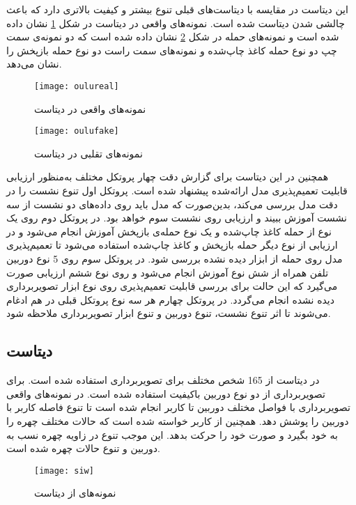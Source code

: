 این دیتاست در مقایسه با دیتاست‌های قبلی تنوع بیشتر و کیفیت بالاتری دارد که باعث چالشی شدن دیتاست شده است. نمونه‌های واقعی در دیتاست  در شکل 
\ref{fig:oulureal}
 نشان داده شده است و نمونه‌های حمله در شکل 
 \ref{fig:oulufake}
 نشان داده شده است که دو نمونه‌ی سمت چپ دو نوع حمله کاغذ چاپ‌شده و نمونه‌های سمت راست دو نوع حمله باز‌پخش را نشان می‌دهد. 
 
  \begin{figure}[h]
 	\centerline{\texttt{[image: oulureal]}}
 	\caption{نمونه‌های واقعی در دیتاست  \cite{boulkenafet2017oulu} }
 	\label{fig:oulureal}
 \end{figure}
 
 
  \begin{figure}[h]
 	\centerline{\texttt{[image: oulufake]}}
 	\caption{نمونه‌های تقلبی در دیتاست  \cite{boulkenafet2017oulu} }
 	\label{fig:oulufake}
 \end{figure}
 
همچنین در این دیتاست برای گزارش دقت چهار پروتکل مختلف به‌منظور ارزیابی قابلیت تعمیم‌پذیری مدل ارائه‌شده پیشنهاد شده است. پروتکل اول تنوع نشست را در دقت مدل بررسی می‌کند، بدین‌صورت که مدل باید روی داده‌های دو نشست از سه نشست آموزش ببیند و ارزیابی روی نشست سوم خواهد بود. در پروتکل دوم روی یک نوع از حمله کاغذ چاپ‌شده و یک نوع حمله‌ی بازپخش آموزش انجام می‌شود و در ارزیابی از نوع دیگر حمله باز‌پخش و کاغذ چاپ‌شده استفاده می‌شود تا تعمیم‌پذیری مدل روی حمله از ابزار دیده نشده بررسی شود. در پروتکل سوم روی 5 نوع دوربین تلفن همراه از شش نوع آموزش انجام می‌شود و روی نوع ششم ارزیابی صورت می‌گیرد که این حالت برای بررسی قابلیت تعمیم‌پذیری روی نوع ابزار تصویر‌برداری دیده نشده انجام می‌گردد. در پروتکل چهارم هر سه نوع پروتکل قبلی در هم ادغام می‌شوند تا اثر تنوع نشست، تنوع دوربین و تنوع ابزار تصویر‌برداری ملاحظه شود.
\subsection{دیتاست }
در دیتاست 
\cite{liu2018learning}
از 165 شخص مختلف برای تصویربرداری استفاده شده است. برای تصویربرداری از دو نوع دوربین با‌کیفیت استفاده شده است. در نمونه‌های واقعی تصویر‌برداری با فواصل مختلف دوربین تا کاربر انجام شده است تا تنوع فاصله کاربر با دوربین را پوشش دهد. همچنین از کاربر خواسته شده است که حالات مختلف چهره را به خود بگیرد و صورت خود را حرکت بدهد. این موجب تنوع در زاویه چهره نسب به دوربین و تنوع حالات چهره شده است.
  \begin{figure}[h]
	\centerline{\texttt{[image: siw]}}
	\caption{نمونه‌های از دیتاست  \cite{liu2018learning} }
	\label{fig:siw}
\end{figure}
\\

